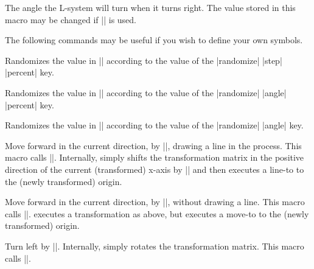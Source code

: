 \begin{command}{\pgfdeclarelindenmayersystem{}}
\begin{command}{\symbol{}}
\begin{command}{\pgflsystemcurrentrightangle}
	The angle the L-system will turn when it turns right.
	The value stored in this macro may be changed if
	|\pgflsystemrandomizerightangle| is used.
\end{command}


The following commands may be useful if you wish to define your own
symbols.

\begin{command}{\pgflsystemrandomizestep}
	Randomizes the value in |\pgflsystemcurrentstep| according to the
	value of the |randomize| |step| |percent| key.
\end{command}

\begin{command}{\pgflsystemrandomizeleftangle}
	Randomizes the value in |\pgflsystemcurrentleftangle| according to
	the value of the |randomize| |angle| |percent| key.
\end{command}

\begin{command}{\pgflsystemrandomizerightangle}
	Randomizes the value in |\pgflsystemcurrentrightangle| according
	to the value of	the |randomize| |angle| key.
\end{command}

\begin{command}{\pgflsystemdrawforward}
	Move forward in the current direction, by |\pgflsystemcurrentstep|,
	drawing a line in the process. This macro calls
	|\pgflsystemrandomizestep|. Internally, \pgfname{} simply
	shifts the transformation matrix in the positive direction of
	the current (transformed) x-axis by |\pgflsystemstep|
	and then executes a line-to to the (newly transformed) origin.
\end{command}

\begin{command}{\pgflsystemmoveforward}
	Move forward in the current direction, by |\pgflsystemcurrentstep|,
	without drawing a line. This macro calls
	|\pgflsystemrandomizestep|. \pgfname{} executes a transformation
	as above, but executes a move-to to the (newly transformed)
	origin.
\end{command}

\begin{command}{\pgflsystemturnleft}
  Turn left by |\pgflsystemcurrentleftangle|. Internally, \pgfname{}
	simply rotates the transformation matrix. This macro calls
	|\pgflsystemrandomizeleftangle|.
\end{command}


\end{command}
\end{command}
